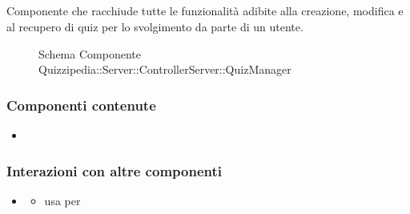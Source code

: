 \subsection{}
Componente che racchiude tutte le funzionalità adibite alla creazione, modifica e al recupero di quiz per lo svolgimento da parte di un utente.
\begin{figure}[H]
\centering
\noindent{}
\caption[Schema Componente Quizzipedia::Server::ControllerServer::QuizManager]{Schema Componente Quizzipedia::Server::ControllerServer::QuizManager}
\end{figure}
\subsubsection{Componenti contenute}
\begin{itemize}
\item {}
\end{itemize}
\subsubsection{Interazioni con altre componenti}
\begin{itemize}
\item {}
\begin{itemize}
\item usa  per 
\end{itemize}
\end{itemize}
